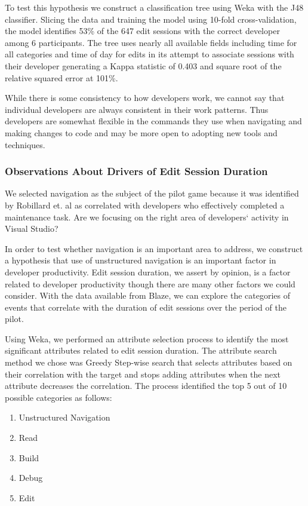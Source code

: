 \documentclass{sig-alternate}
\begin{document}
To test this hypothesis we construct a classification tree using Weka \cite{Hall2009WEKA} with the J48 classifier.  Slicing the data and training the model using 10-fold cross-validation, the model identifies 53\% of the 647 edit sessions with the correct developer among 6 participants.  The tree uses nearly all available fields including time for all categories and time of day for edits in its attempt to associate sessions with their developer generating a Kappa statistic of 0.403  and square root of the relative squared error at 101\%.  

While there is some consistency to how developers work, we cannot say that individual developers are always consistent in their work patterns.  Thus developers are somewhat flexible in the commands they use when navigating and making changes to code and may be more open to adopting new tools and techniques.\

\subsubsection{Observations About Drivers of Edit Session Duration}

We selected navigation as the subject of the pilot game because it was identified by Robillard et. al\cite{wbsnipes:Robillard2004How} as correlated with developers who effectively completed a maintenance task.    Are we focusing on the right area of developers` activity in Visual Studio?

In order to test whether navigation is an important area to address, we construct a hypothesis that use of unstructured navigation is an important factor in developer productivity.  Edit session duration, we assert by opinion, is a factor related to developer productivity though there are many other factors we could consider.  With the data available from Blaze, we can explore the categories of events that correlate with the duration of edit sessions over the period of the pilot.  

Using Weka\cite{Hall2009WEKA}, we performed an attribute selection process to identify the most significant attributes related to edit session duration.  The attribute search method we chose was Greedy Step-wise search that selects attributes based on their correlation with the target and stops adding attributes when the next attribute decreases the correlation.    The process identified the top 5 out of 10 possible categories as follows:
\begin{enumerate}
\item Unstructured Navigation
\item Read
\item Build
\item Debug
\item Edit
\end{enumerate}
\end{document}

